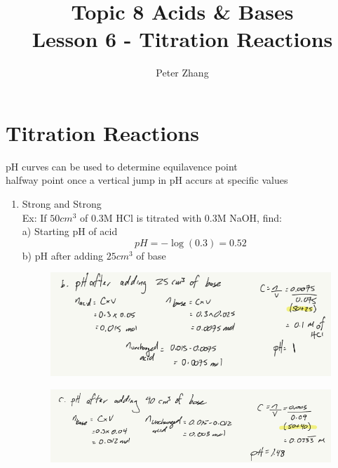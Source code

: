 \documentclass{article}
\title{Topic 8 Acids \& Bases\\Lesson 6 - Titration Reactions}
\author{Peter Zhang}
\begin{document}
\maketitle
\tableofcontents
\newpage

\section{Titration Reactions}
pH curves can be used to determine equilavence point\\halfway point once a vertical jump in pH accurs at specific values

\begin{enumerate}
\subsection{Strong and Strong Reactions}
\item Strong and Strong\\
Ex: If $50cm^3$ of 0.3M HCl is titrated with 0.3M NaOH, find:\\
a) Starting pH of acid
$$pH = -\log{(0.3)} = 0.52$$
b) pH after adding $25cm^3$ of base
\begin{figure}[H]
\includegraphics[width=\textwidth]{4.6fig1.png}
\end{figure}

\begin{figure}[H]
\includegraphics[width=\textwidth]{4.6fig2.png}
\end{figure}


\end{enumerate}
\end{document}
